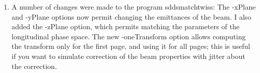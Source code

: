 \begin{enumerate}
\item A number of changes were made to the program sddsmatchtwiss: The
-xPlane and -yPlane options now permit changing the emittances of the
beam.  I also added the -zPlane option, which permits matching the
parameters of the longitudinal phase space. The new -oneTransform
option allows computing the transform only for the first page, and
using it for all pages; this is useful if you want to simulate
correction of the beam properties with jitter about the correction.

\end{enumerate}



